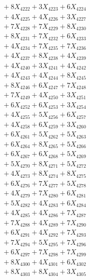 \documentclass[a4paper,10pt]{article}
\begin{document}
{\begin{align}
&\;  + 8 X_{4222} + 3 X_{4223} + 6 X_{4224} \\[0.3ex]
&\;  + 4 X_{4225} + 4 X_{4226} + 3 X_{4227} \\[0.3ex]
&\;  + 7 X_{4228} + 7 X_{4229} + 8 X_{4230} \\[0.3ex]
&\;  + 8 X_{4231} + 7 X_{4232} + 6 X_{4233} \\[0.3ex]
&\;  + 4 X_{4234} + 7 X_{4235} + 7 X_{4236} \\[0.3ex]
&\;  + 4 X_{4237} + 8 X_{4238} + 4 X_{4239} \\[0.5ex]\allowbreak
&\;  + 4 X_{4240} + 3 X_{4241} + 4 X_{4242} \\[0.3ex]
&\;  + 4 X_{4243} + 4 X_{4244} + 8 X_{4245} \\[0.3ex]
&\;  + 8 X_{4246} + 6 X_{4247} + 7 X_{4248} \\[0.3ex]
&\;  + 7 X_{4249} + 4 X_{4250} + 3 X_{4251} \\[0.3ex]
&\;  + 6 X_{4252} + 6 X_{4253} + 3 X_{4254} \\[0.3ex]
&\;  + 4 X_{4255} + 5 X_{4256} + 6 X_{4257} \\[0.3ex]
&\;  + 4 X_{4258} + 6 X_{4259} + 3 X_{4260} \\[0.3ex]
&\;  + 6 X_{4261} + 5 X_{4262} + 5 X_{4263} \\[0.3ex]
&\;  + 6 X_{4264} + 8 X_{4265} + 5 X_{4266} \\[0.3ex]
&\;  + 6 X_{4267} + 6 X_{4268} + 5 X_{4269} \\[0.5ex]\allowbreak
&\;  + 5 X_{4270} + 8 X_{4271} + 5 X_{4272} \\[0.3ex]
&\;  + 4 X_{4273} + 8 X_{4274} + 8 X_{4275} \\[0.3ex]
&\;  + 6 X_{4276} + 7 X_{4277} + 5 X_{4278} \\[0.3ex]
&\;  + 4 X_{4279} + 7 X_{4280} + 6 X_{4281} \\[0.3ex]
&\;  + 5 X_{4282} + 4 X_{4283} + 6 X_{4284} \\[0.3ex]
&\;  + 4 X_{4285} + 4 X_{4286} + 7 X_{4287} \\[0.3ex]
&\;  + 7 X_{4288} + 4 X_{4289} + 7 X_{4290} \\[0.3ex]
&\;  + 6 X_{4291} + 4 X_{4292} + 7 X_{4293} \\[0.3ex]
&\;  + 7 X_{4294} + 5 X_{4295} + 7 X_{4296} \\[0.3ex]
&\;  + 6 X_{4297} + 7 X_{4298} + 7 X_{4299} \\[0.5ex]\allowbreak
&\;  + 8 X_{4300} + 4 X_{4301} + 6 X_{4302} \\[0.3ex]
&\;  + 8 X_{4303} + 8 X_{4304} + 3 X_{4305} \\[0.3ex]

\end{align}}
\end{document}

